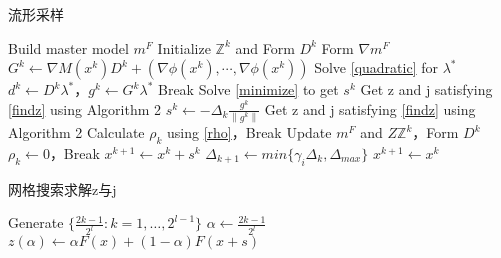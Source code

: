 \documentclass[macfonts]{njuthesis}
\begin{document}
\begin{algorithm}
        \caption{流形采样}
        \label{algorithm1}
        \begin{algorithmic}[1] %
\STATE{Choose $\Delta_0$ in $(0,\Delta_{max}]$ and initialize $x^0$}
		  \STATE Build master model $m^F$
		  \STATE Initialize $\mathbb{Z}^k$ and Form $D^k$
		  \STATE Form $\nabla m^F$
		  \STATE $G^{k} \gets \nabla M\left(x^{k}\right) D^{k}+(\nabla \phi(x^k),\cdots,\nabla \phi(x^k))$
		  \STATE Solve \ref{quadratic} for $\lambda^*$
		  \STATE $d^k\gets D^k \lambda^*$，$g^k\gets G^k\lambda^*$
		  \STATE Break
		  \ENDIF
		  \STATE Solve \ref{minimize} to get $s^k$
		  \STATE Get z and j satisfying \ref{findz} using Algorithm 2
		  \STATE $s^k\gets -\Delta_{k} \frac{g^{k}}{\left\|g^{k}\right\|}$
		  \STATE Get z and j satisfying \ref{findz} using Algorithm 2
		  \ENDIF
		  \STATE Calculate $\rho_k$ using \ref{rho}，Break
		  \ELSE
		  \STATE Update $m^F$ and $Z\mathbb{Z}^k$，Form $D^k$
		  \ENDIF
		  \ELSE
		  \STATE $\rho_k\gets 0$，Break
		  \ENDIF
		  \ENDWHILE
		  \STATE $x^{k+1}\gets x^k+s^k$
		  \STATE $\Delta_{k+1}\gets min\{\gamma_i\Delta_k,\Delta_{max}\}$
		  \ELSE
		  \STATE $x^{k+1}\gets x^k$
		  \ENDIF
		  \ENDFOR
		  
\end{algorithmic}
\end{algorithm}

\newpage
\begin{algorithm}	
	
        \caption{网格搜索求解z与j}
        \label{algorithm2}
        \begin{algorithmic}[1] %
        \STATE{}
        \ENDIF
        \STATE{}
        \ENDIF
        \STATE Generate $\{\frac{2 k-1}{2^{l}}: k=1, \ldots, 2^{l-1}\}$
        \STATE $\alpha\gets\frac{2k-1}{2^l}$
        \STATE $z(\alpha)\gets\alpha F(x)+(1-\alpha)F(x+s)$
        \STATE{}
        \ENDIF
        
        \ENDFOR
        \ENDFOR
\end{algorithmic}
\end{algorithm}
\end{document}
